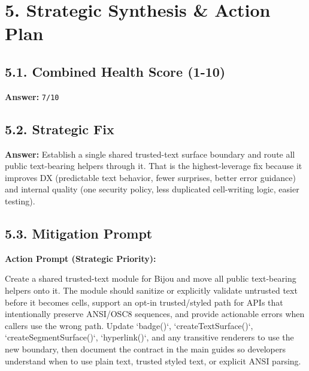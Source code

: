 \section{5. Strategic Synthesis \& Action Plan}\label{record-416-strategic-synthesis-action-plan}

\subsection{5.1. Combined Health Score (1-10)}\label{record-416-combined-health-score-1-10}

\textbf{Answer:} \texttt{7\allowbreak{}/\allowbreak{}1\allowbreak{}0}

\subsection{5.2. Strategic Fix}\label{record-416-strategic-fix}

\textbf{Answer:} Establish a single shared trusted-text surface boundary and route all public text-bearing helpers through it. That is the highest-leverage fix because it improves DX (predictable text behavior, fewer surprises, better error guidance) and internal quality (one security policy, less duplicated cell-writing logic, easier testing).

\subsection{5.3. Mitigation Prompt}\label{record-416-mitigation-prompt}

\textbf{Action Prompt (Strategic Priority):}

\begin{CodeBlock}
Create a shared trusted-text module for Bijou and move all public text-bearing helpers onto it. The module should sanitize or explicitly validate untrusted text before it becomes cells, support an opt-in trusted/styled path for APIs that intentionally preserve ANSI/OSC8 sequences, and provide actionable errors when callers use the wrong path. Update `badge()`, `createTextSurface()`, `createSegmentSurface()`, `hyperlink()`, and any transitive renderers to use the new boundary, then document the contract in the main guides so developers understand when to use plain text, trusted styled text, or explicit ANSI parsing.
\end{CodeBlock}

